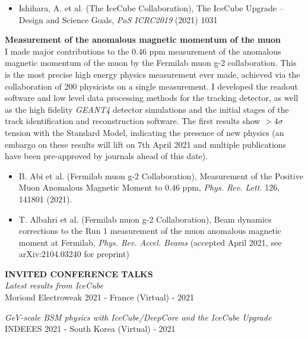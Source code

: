 \documentclass[a4paper,11pt]{article}
\newcounter{bar}
\renewcommand{\smallskip} {\vspace{0.1in}}
\begin{document}
\begin{itemize}
    \item Ishihara, A. et al. (The IceCube Collaboration), The IceCube Upgrade -- Design and Science Goals, \textit{PoS ICRC2019} (2021) 1031
\end{itemize}

\vspace{0.2cm}

{\bf Measurement of the anomalous magnetic momentum of the muon} \\ 
I made major contributions to the 0.46 ppm measurement of the anomalous magnetic momentum of the muon by the Fermilab muon g-2 collaboration. This is the most precise high energy physics measurement ever made, achieved via the collaboration of 200 physicists on a single measurement. I developed the readout software and low level data processing methods for the tracking detector, as well as the high fidelity \textit{GEANT4} detector simulations and the initial stages of the track identification and reconstruction software. The first results show $>4 \sigma$ tension with the Standard Model, indicating the presence of new physics (an embargo on these results will lift on 7th April 2021 and multiple publications have been pre-approved by journals ahead of this date).

\begin{itemize}
    \item B. Abi et al. (Fermilab muon g-2 Collaboration), Measurement of the Positive Muon Anomalous Magnetic Moment to 0.46 ppm,  \textit{Phys. Rev. Lett.} 126, 141801 (2021).  
    \item T. Albahri et al. (Fermilab muon g-2 Collaboration), Beam dynamics corrections to the Run 1 measurement of the muon anomalous magnetic moment at Fermilab, \textit{Phys. Rev. Accel. Beams} (accepted April 2021, see arXiv:2104.03240 for preprint)
\end{itemize}

\vspace{0.5cm}

\textbf{INVITED CONFERENCE TALKS ~~\hrulefill}\smallskip\\
%
{\it Latest results from IceCube} \\ 
 Moriond Electroweak 2021 - France (Virtual) - 2021
 
 {\it GeV-scale BSM physics with IceCube/DeepCore and the IceCube Upgrade} \\ 
 INDEEES 2021 - South Korea (Virtual) - 2021
\end{document}
